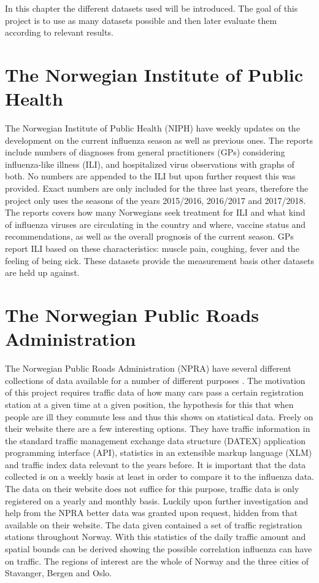 In this chapter the different datasets used will be introduced. The goal of this project is to use as many datasets possible and then later evaluate them according to relevant results.

\section{The Norwegian Institute of Public Health}
The Norwegian Institute of Public Health (NIPH) have weekly updates\cite{fhi} on the development on the current influenza season as well as previous ones. The reports include numbers of diagnoses from general practitioners (GPs) considering influenza-like illness (ILI), and hospitalized virus observations with graphs of both. No numbers are appended to the ILI but upon further request this was provided. Exact numbers are only included for the three last years, therefore the project only uses the seasons of the years 2015/2016, 2016/2017 and 2017/2018. The reports covers how many Norwegians seek treatment for ILI and what kind of influenza viruses are circulating in the country and where, vaccine status and recommendations, as well as the overall prognosis of the current season. GPs report ILI based on these characteristics: muscle pain, coughing, fever and the feeling of being sick. These datasets provide the measurement basis other datasets are held up against.

\section{The Norwegian Public Roads Administration}
The Norwegian Public Roads Administration (NPRA) have several different collections of data available for a number of different purposes \cite{vegvesenet}. The motivation of this project requires traffic data of how many cars pass a certain registration station at a given time at a given position, the hypothesis for this that when people are ill they commute less and thus this shows on statistical data. Freely on their website \cite{vegvesenet} there are a few interesting options. They have traffic information in the standard traffic management exchange data structure (DATEX) application programming interface (API), statistics in an extensible markup language (XLM) and traffic index data relevant to the years before. It is important that the data collected is on a weekly basis at least in order to compare it to the influenza data. The data on their website does not suffice for this purpose, traffic data is only registered on a yearly and monthly basis. Luckily upon further investigation and help from the NPRA better data was granted upon request, hidden from that available on their website. The data given contained a set of traffic registration stations throughout Norway. With this statistics of the daily traffic amount and spatial bounds can be derived showing the possible correlation influenza can have on traffic. The regions of interest are the whole of Norway and the three cities of Stavanger, Bergen and Oslo.

